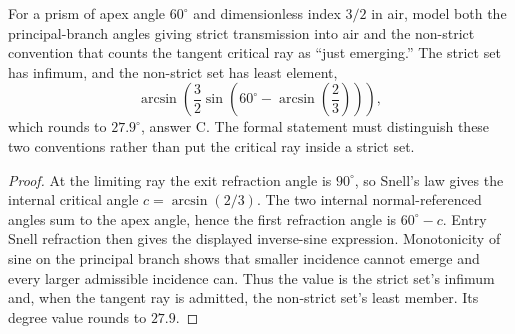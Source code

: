 \begin{theorem}
\label{thm:physics:phyx_mini_0009:target}
For a prism of apex angle $60^\circ$ and dimensionless index $3/2$ in air,
model both the principal-branch angles giving strict transmission into air
and the non-strict convention that counts the tangent critical ray as ``just
emerging.'' The strict set has infimum, and the non-strict set has least
element,
\[
\arcsin\!\left(\frac32\sin\!\left(60^\circ-
  \arcsin\!\left(\frac23\right)\right)\right),
\]
which rounds to $27.9^\circ$, answer C. The formal statement must distinguish
these two conventions rather than put the critical ray inside a strict set.
\end{theorem}
\begin{proof}
At the limiting ray the exit refraction angle is $90^\circ$, so Snell's law
gives the internal critical angle $c=\arcsin(2/3)$. The two internal
normal-referenced angles sum to the apex angle, hence the first refraction
angle is $60^\circ-c$. Entry Snell refraction then gives the displayed
inverse-sine expression. Monotonicity of sine on the principal branch shows
that smaller incidence cannot emerge and every larger admissible incidence
can. Thus the value is the strict set's infimum and, when the tangent ray is
admitted, the non-strict set's least member. Its degree value rounds to
$27.9$.
\end{proof}

